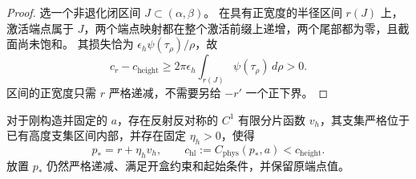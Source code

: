 \begin{proof}
选一个非退化闭区间 $J\subset(\alpha,\beta)$。
在具有正宽度的半径区间 $r(J)$ 上，激活端点属于 $J$，两个端点映射都在整个激活前缀上递增，两个尾部都为零，且截面尚未饱和。
其损失恰为 $\epsilon_h\psi(\tau_\rho)/\rho$，故
\[
 c_r-c_{\mathrm{height}}
 \ge2\pi\epsilon_h\int_{r(J)}\psi(\tau_\rho)\,d\rho>0.
\]
区间的正宽度只需 $r$ 严格递减，不需要另给 $-r'$ 一个正下界。
\end{proof}

\begin{proposition}[固定新高度后的纵向下降]
\label{prop:upper-longitudinal}
对于刚构造并固定的 $a$，存在反射反对称的 $C^1$ 有限分片函数 $v_h$，其支集严格位于已有高度支集区间内部，并存在固定 $\eta_h>0$，使得
\[
 p_*=r+\eta_hv_h,\qquad
 c_{\mathrm{hl}}:=C_{\mathrm{phys}}(p_*,a)<c_{\mathrm{height}}.
\]
放置 $p_*$ 仍然严格递减、满足开盒约束和起始条件，并保留原端点值。
\end{proposition}

